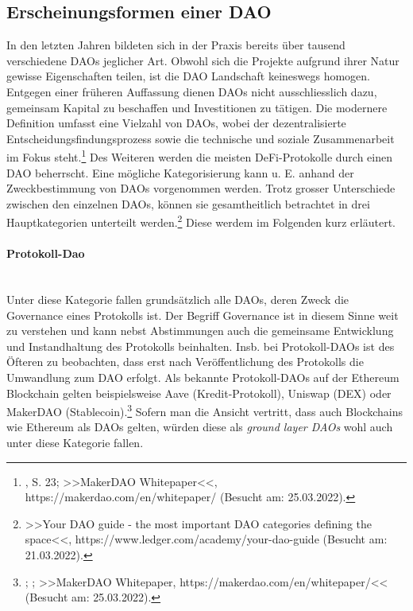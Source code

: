 \documentclass[a4paper,12pt]{report}
\begin{document}
        \subsection{Erscheinungsformen einer DAO} \label{ErscheinungsformenDAO}
        \startsubsection
        In den letzten Jahren bildeten sich in der Praxis bereits über tausend verschiedene DAOs jeglicher Art. Obwohl sich die Projekte aufgrund ihrer Natur gewisse Eigenschaften teilen, ist die DAO Landschaft keineswegs homogen. Entgegen einer früheren  Auffassung dienen DAOs nicht ausschliesslich dazu, gemeinsam Kapital zu beschaffen und Investitionen zu tätigen. Die modernere Definition umfasst eine Vielzahl von DAOs, wobei der dezentralisierte Entscheidungsfindungsprozess sowie die technische und soziale Zusammenarbeit im Fokus steht.\footnote{\hspace{0.5em}\begin{minipage}[t]{13cm}\citeauthor{ETH14}, S. 23; >>MakerDAO Whitepaper<<, https://makerdao.com/en/whitepaper/ (Besucht am: 25.03.2022).\end{minipage}} Des Weiteren werden die meisten DeFi-Protokolle durch einen DAO beherrscht. Eine mögliche  Kategorisierung kann u. E. anhand der Zweckbestimmung von DAOs vorgenommen werden. Trotz grosser Unterschiede zwischen den einzelnen DAOs, können sie gesamtheitlich betrachtet in drei Hauptkategorien unterteilt werden.\footnote{\hspace{0.5em}\begin{minipage}[t]{13cm}>>Your DAO guide - the most important DAO categories defining the space<<, https://www.ledger.com/academy/your-dao-guide (Besucht am: 21.03.2022).\end{minipage}} Diese werdem im Folgenden kurz erläutert.
        \paragraph{Protokoll-Dao} \hfill \\
        Unter diese Kategorie fallen grundsätzlich alle DAOs, deren Zweck die Governance eines Protokolls ist. Der Begriff Governance ist in diesem Sinne weit zu verstehen und kann nebst Abstimmungen auch die gemeinsame Entwicklung und Instandhaltung des Protokolls beinhalten. Insb. bei Protokoll-DAOs ist des Öfteren zu beobachten, dass erst nach Veröffentlichung des Protokolls die Umwandlung zum DAO erfolgt. Als bekannte Protokoll-DAOs auf der Ethereum Blockchain gelten beispielsweise Aave (Kredit-Protokoll), Uniswap (DEX) oder MakerDAO (Stablecoin).\footnote{\hspace{0.5em}\begin{minipage}[t]{13cm}\citeauthor{Aave}; \citeauthor{Uniswap}; >>MakerDAO Whitepaper, https://makerdao.com/en/whitepaper/<< (Besucht am: 25.03.2022).\end{minipage}} Sofern man die Ansicht vertritt, dass auch Blockchains wie Ethereum als DAOs gelten, würden diese als \textit{ground layer DAOs} wohl auch unter diese Kategorie fallen.
        
\end{document}
